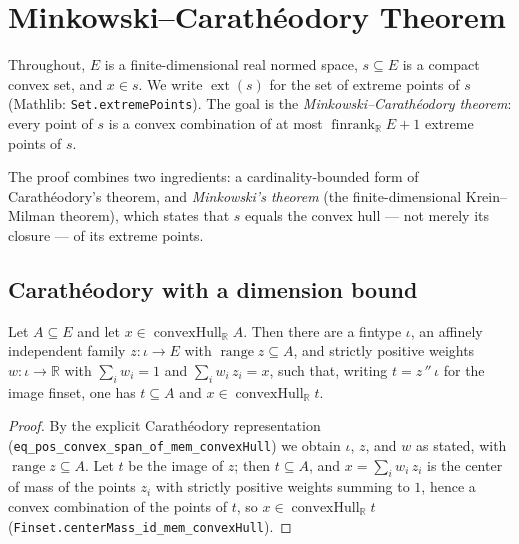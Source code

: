 


\section{Minkowski--Carathéodory Theorem}

Throughout, $E$ is a finite-dimensional real normed space, $s \subseteq E$ is a
compact convex set, and $x \in s$. We write $\operatorname{ext}(s)$ for the set
of extreme points of $s$ (Mathlib: \texttt{Set.extremePoints}). The goal is the
\emph{Minkowski--Carathéodory theorem}: every point of $s$ is a convex
combination of at most $\operatorname{finrank}_{\mathbb R} E + 1$ extreme points
of $s$.

The proof combines two ingredients: a cardinality-bounded form of
Carathéodory's theorem, and \emph{Minkowski's theorem} (the finite-dimensional
Krein--Milman theorem), which states that $s$ equals the convex hull --- not
merely its closure --- of its extreme points.

\subsection{Carathéodory with a dimension bound}

\begin{lemma}
    \label{lem:caratheodory-image-mem}
    \leanok
    Let $A \subseteq E$ and let $x \in \operatorname{convexHull}_{\mathbb R} A$.
    Then there are a fintype $\iota$, an affinely independent family
    $z : \iota \to E$ with $\operatorname{range} z \subseteq A$, and strictly
    positive weights $w : \iota \to \mathbb R$ with $\sum_i w_i = 1$ and
    $\sum_i w_i\, z_i = x$, such that, writing $t = z\,''\,\iota$ for the image
    finset, one has $t \subseteq A$ and
    $x \in \operatorname{convexHull}_{\mathbb R} t$.
\end{lemma}
\begin{proof}
    By the explicit Carathéodory representation
    (\texttt{eq\_pos\_convex\_span\_of\_mem\_convexHull}) we obtain $\iota$, $z$,
    and $w$ as stated, with $\operatorname{range} z \subseteq A$. Let $t$ be the
    image of $z$; then $t \subseteq A$, and $x = \sum_i w_i\, z_i$ is the center of
    mass of the points $z_i$ with strictly positive weights summing to $1$, hence
    a convex combination of the points of $t$, so
    $x \in \operatorname{convexHull}_{\mathbb R} t$
    (\texttt{Finset.centerMass\_id\_mem\_convexHull}).
\end{proof}

